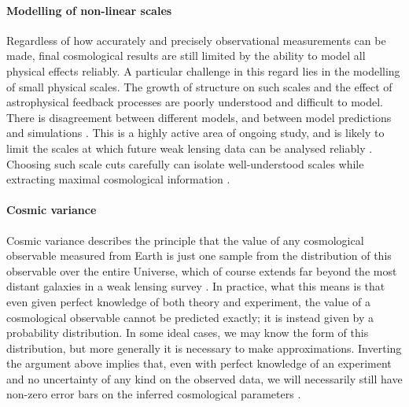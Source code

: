 \paragraph{Modelling of non-linear scales}

Regardless of how accurately and precisely observational measurements can be made, final cosmological results are still limited by the ability to model all physical effects reliably. A particular challenge in this regard lies in the modelling of small physical scales. The growth of structure on such scales and the effect of astrophysical feedback processes are poorly understood and difficult to model. There is disagreement between different models, and between model predictions and simulations \citep{Casarini2011, Schneider2016, Giblin2019, Bose2019, Bose2020}. This is a highly active area of ongoing study, and is likely to limit the scales at which future weak lensing data can be analysed reliably \citep{Huterer2005, Jing2006, vanDaalen2011, Semboloni2011, Semboloni2013, Zentner2013, Mohammed2014, Eifler2015, MacCrann2017, Copeland2018, Huang2019, Huang2021, Martinelli2021}. Choosing such scale cuts carefully can isolate well-understood scales while extracting maximal cosmological information \citep{Kitching2011, Taylor2018, Deshpande2020, Taylor2021a, Taylor2021b}.

\paragraph{Cosmic variance}

Cosmic variance describes the principle that the value of any cosmological observable measured from Earth is just one sample from the distribution of this observable over the entire Universe, which of course extends far beyond the most distant galaxies in a weak lensing survey \citep{Kamionkowski1997, Wiltshire2007, Driver2010, Moster2011}. In practice, what this means is that even given perfect knowledge of both theory and experiment, the value of a cosmological observable cannot be predicted exactly; it is instead given by a probability distribution. In some ideal cases, we may know the form of this distribution, but more generally it is necessary to make approximations. Inverting the argument above implies that, even with perfect knowledge of an experiment and no uncertainty of any kind on the observed data, we will necessarily still have non-zero error bars on the inferred cosmological parameters \citep[e.g.][]{Martel1998, Taylor2010}.

